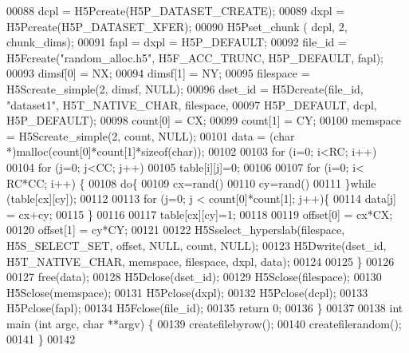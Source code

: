\begin{DoxyCode}
00088     dcpl = H5Pcreate(H5P\_DATASET\_CREATE);
00089     dxpl = H5Pcreate(H5P\_DATASET\_XFER);
00090     H5Pset\_chunk ( dcpl, 2, chunk\_dims);
00091     fapl = dxpl = H5P\_DEFAULT;
00092     file\_id = H5Fcreate(\textcolor{stringliteral}{"random\_alloc.h5"}, H5F\_ACC\_TRUNC, H5P\_DEFAULT, fapl);
00093     dimsf[0] = NX;
00094     dimsf[1] = NY;
00095     filespace = H5Screate\_simple(2, dimsf, NULL); 
00096     dset\_id = H5Dcreate(file\_id, \textcolor{stringliteral}{"dataset1"}, H5T\_NATIVE\_CHAR, filespace,
00097             H5P\_DEFAULT, dcpl, H5P\_DEFAULT);
00098     count[0] = CX;
00099     count[1] = CY;
00100     memspace = H5Screate\_simple(2, count, NULL);
00101     data = (\textcolor{keywordtype}{char} *)malloc(count[0]*count[1]*\textcolor{keyword}{sizeof}(\textcolor{keywordtype}{char}));
00102 
00103     \textcolor{keywordflow}{for} (i=0; i<RC; i++)
00104         \textcolor{keywordflow}{for} (j=0; j<CC; j++)
00105             table[i][j]=0;
00106 
00107     \textcolor{keywordflow}{for} (i=0; i< RC*CC; i++) \{ 
00108         \textcolor{keywordflow}{do}\{
00109             cx=rand()%
00110             cy=rand()%
00111         \}\textcolor{keywordflow}{while} (table[cx][cy]);
00112 
00113         \textcolor{keywordflow}{for} (j=0; j < count[0]*count[1]; j++)\{
00114             data[j] = cx+cy;
00115         \}
00116 
00117         table[cx][cy]=1;
00118         
00119         offset[0] = cx*CX;
00120         offset[1] = cy*CY;
00121 
00122         H5Sselect\_hyperslab(filespace, H5S\_SELECT\_SET, offset, NULL, count, NULL);
00123         H5Dwrite(dset\_id, H5T\_NATIVE\_CHAR, memspace, filespace, dxpl, data);
00124         
00125     \} 
00126  
00127     free(data);
00128     H5Dclose(dset\_id);
00129     H5Sclose(filespace);
00130     H5Sclose(memspace);
00131     H5Pclose(dxpl);
00132     H5Pclose(dcpl);
00133     H5Pclose(fapl);
00134     H5Fclose(file\_id);
00135     \textcolor{keywordflow}{return} 0;
00136 \}     
00137 
00138 \textcolor{keywordtype}{int} main (\textcolor{keywordtype}{int} argc, \textcolor{keywordtype}{char} **argv) \{
00139     createfilebyrow();
00140     createfilerandom();
00141 \}     
00142 
\end{DoxyCode}
